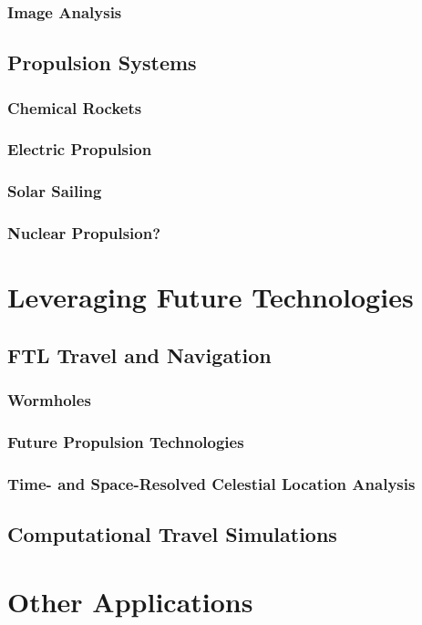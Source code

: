 \documentclass{article}
\begin{document}
        \subsubsection{Image Analysis}
    \subsection{Propulsion Systems}
        \subsubsection{Chemical Rockets}
        \subsubsection{Electric Propulsion}
        \subsubsection{Solar Sailing}
        \subsubsection{Nuclear Propulsion?}
    
\section{Leveraging Future Technologies}
    \subsection{FTL Travel and Navigation}
        \subsubsection{Wormholes}
        \subsubsection{Future Propulsion Technologies}
        \subsubsection{Time- and Space-Resolved Celestial Location Analysis}
    \subsection{Computational Travel Simulations}
    
\section{Other Applications}
\end{document}
